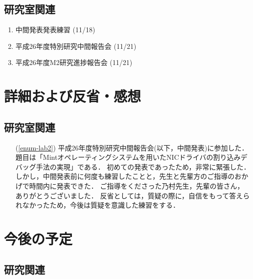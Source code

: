 \documentclass[fleqn, 14pt]{extarticle}
\begin{document}
\subsection{研究室関連}
\label{sec-2-2}
\begin{enumerate}
\item 中間発表発表練習
\hfill
\label{enum-lab1}
(11/18)
\item 平成26年度特別研究中間報告会
\hfill
\label{enum-lab2}
(11/21)
\item 平成26年度M2研究進捗報告会
\hfill
\label{enum-11}
(11/21)
\end{enumerate}





\section{詳細および反省・感想}
\label{sec-3}
\setcounter{subsection}{1}
\subsection{研究室関連}
\label{sec-3-1}

\begin{itemize}
\item[(\ref{enum-lab2})]
平成26年度特別研究中間報告会(以下，中間発表)に参加した．
題目は「Mintオペレーティングシステムを用いたNICドライバの割り込みデバッグ手法の実現」である．
初めての発表であったため，非常に緊張した．
しかし，中間発表前に何度も練習したことと，先生と先輩方のご指導のおかげで時間内に発表できた．
ご指導をくださった乃村先生，先輩の皆さん，ありがとうございました．
反省としては，質疑の際に，自信をもって答えられなかったため，今後は質疑を意識した練習をする．
\end{itemize}


\section{今後の予定}
\label{sec-4}
\subsection{研究関連}
\label{sec-4-1}
\end{document}
